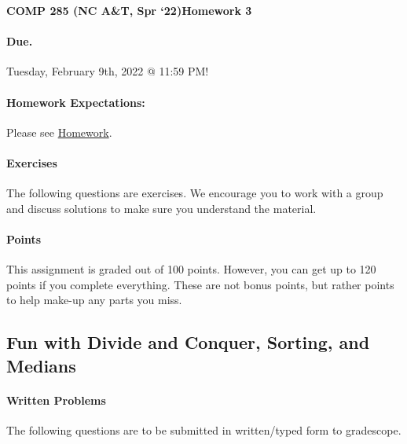 \documentclass [12pt]{article}
\begin{document}
 

{\LARGE \textbf {COMP 285 (NC A\&T, Spr `22)}\hfill \textbf {Homework 3} } 
\vspace {1em} 
\begin {Instruction} 

\paragraph {Due.} Tuesday, February 9th, 2022 @ 11:59 PM!
\end {Instruction} 

\vspace {1em} 
\begin {Instruction} \paragraph {Homework Expectations:} Please see \href{https://www.comp285.ml/homework/#general-homework-information}{Homework}.
\end {Instruction}

\vspace {1em} 
\begin {Instruction} 

\paragraph {Exercises} The following questions are exercises. We encourage you to work with a group and discuss solutions to make sure you understand the material.

\paragraph {Points} This assignment is graded out of 100 points. However, you can get up to 120 points if you complete everything. These are not bonus points, but rather points to help make-up any parts you miss.

\end {Instruction} 

\begin{centering}
\section*{Fun with Divide and Conquer, Sorting, and Medians}
\end{centering}

\begin{Instruction}

\paragraph{Written Problems} The following questions are to be submitted in written/typed form to gradescope.

\end{Instruction}
\end{document}

